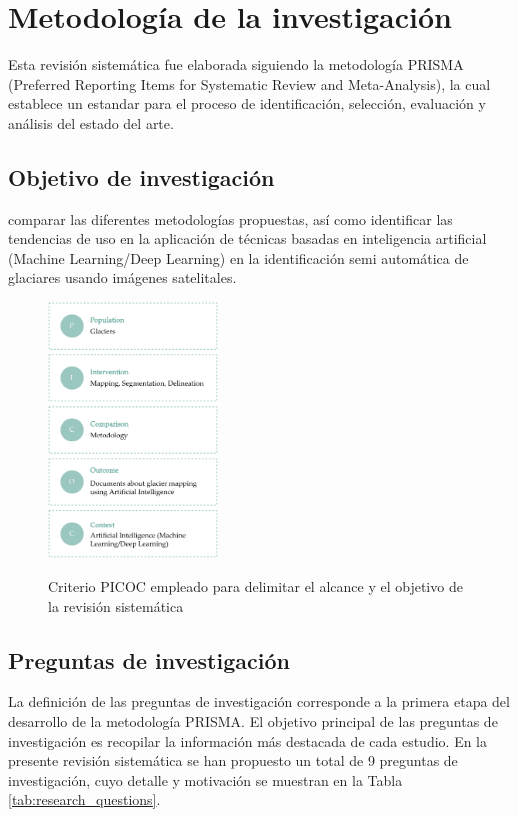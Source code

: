 \documentclass{article}
\begin{document}
\section{Metodología de la investigación}

Esta revisión sistemática fue elaborada siguiendo la metodología PRISMA (Preferred Reporting Items for Systematic Review and Meta-Analysis), la cual establece un estandar para el proceso de identificación, selección, evaluación  y análisis del estado del arte.

\subsection{Objetivo de investigación}

comparar las diferentes metodologías propuestas, así como identificar las tendencias de uso en la aplicación de técnicas basadas en inteligencia artificial (Machine Learning/Deep Learning) en la identificación semi automática de glaciares usando imágenes satelitales.

\begin{figure}[H]
    \centering
    \includegraphics[width=0.4\textwidth]{images/picoc.pdf}
    \label{fig:picoc}
    \caption{Criterio PICOC empleado para delimitar el alcance y el objetivo de la revisión sistemática}
\end{figure}

\subsection{Preguntas de investigación}

La definición de las preguntas de investigación corresponde a la primera etapa del desarrollo de la metodología PRISMA. El objetivo principal de las preguntas de investigación es recopilar la información más destacada de cada estudio. En la presente revisión sistemática se han propuesto un total de 9 preguntas de investigación, cuyo detalle y motivación se muestran en la Tabla \ref{tab:research_questions}.
\end{document}
